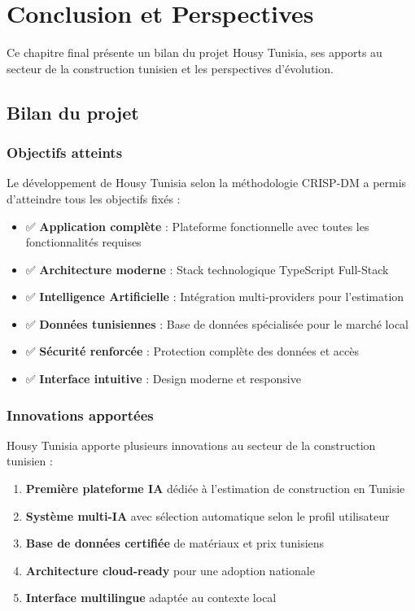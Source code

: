 \documentclass[12pt, a4paper]{report}
\begin{document}
\chapter{Conclusion et Perspectives}

\begin{objectivebox}
Ce chapitre final présente un bilan du projet Housy Tunisia, ses apports au secteur de la construction tunisien et les perspectives d'évolution.
\end{objectivebox}

\section{Bilan du projet}

\subsection{Objectifs atteints}

Le développement de Housy Tunisia selon la méthodologie CRISP-DM a permis d'atteindre tous les objectifs fixés :

\begin{itemize}
    \item ✅ \textbf{Application complète} : Plateforme fonctionnelle avec toutes les fonctionnalités requises
    \item ✅ \textbf{Architecture moderne} : Stack technologique TypeScript Full-Stack
    \item ✅ \textbf{Intelligence Artificielle} : Intégration multi-providers pour l'estimation
    \item ✅ \textbf{Données tunisiennes} : Base de données spécialisée pour le marché local
    \item ✅ \textbf{Sécurité renforcée} : Protection complète des données et accès
    \item ✅ \textbf{Interface intuitive} : Design moderne et responsive
\end{itemize}

\subsection{Innovations apportées}

Housy Tunisia apporte plusieurs innovations au secteur de la construction tunisien :

\begin{enumerate}
    \item \textbf{Première plateforme IA} dédiée à l'estimation de construction en Tunisie
    \item \textbf{Système multi-IA} avec sélection automatique selon le profil utilisateur
    \item \textbf{Base de données certifiée} de matériaux et prix tunisiens
    \item \textbf{Architecture cloud-ready} pour une adoption nationale
    \item \textbf{Interface multilingue} adaptée au contexte local
\end{enumerate}
\end{document}
